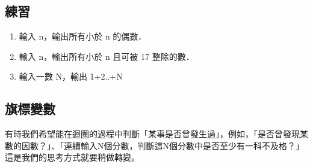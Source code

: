 \documentclass[a4paper,12pt]{article}
\begin{document}
\subsection{練習}
\label{sec:org6e5eedf}
\begin{enumerate}
\item 輸入 n，輸出所有小於 n 的偶數．\\
\item 輸入 n，輸出所有小於 n 且可被 17 整除的數．\\
\item 輸入一數 N，輸出 1+2..+N\\
\end{enumerate}

\subsection{旗標變數}
\label{flag_variable}
有時我們希望能在迴圈的過程中判斷「某事是否曾發生過」，例如，「是否曾發現某數的因數？」、「連續輸入N個分數，判斷這N個分數中是否至少有一科不及格？」這是我們的思考方式就要稍做轉變。\\
\end{document}
